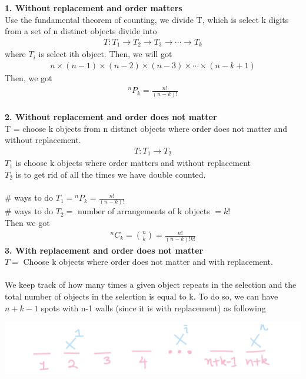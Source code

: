 \documentclass[11pt,oneside]{book}
\theoremstyle{break}
\theoremstyle{break}
\newcommand*{\Perm}[2]{{}^{#1}\!P_{#2}}
\newcommand*{\Comb}[2]{{}^{#1}C_{#2}}
\begin{document}
\hfill\\
\hfill\\
\textbf{1. Without replacement and order matters}\\
Use the fundamental theorem of counting, we divide T, which is select k digits from a set of n distinct objects divide into \begin{align*}
T:T_1\rightarrow T_2\rightarrow T_3 \rightarrow \cdots \rightarrow T_k
\end{align*}
where $T_i$ is select ith object. Then, we will got \begin{align*}
n\times (n-1)\times (n-2) \times (n-3) \times \cdots \times (n-k+1)
\end{align*}
Then, we got \begin{align*}
\Perm{n}{k}=\frac{n!}{(n-k)!}
\end{align*}
\hfill\\
\textbf{2. Without replacement and order does not matter}\\
T = choose k objects from n distinct objects where order does not matter and without replacement. \begin{align*}
T:T_1\rightarrow T_2
\end{align*}
$T_1$ is choose k objects where order matters and without replacement \\
$T_2$ is to get rid of all the times we have double counted.\\
\hfill\\
$\#$ ways to do $T_1=\Perm{n}{k}=\frac{n!}{(n-k)!}$\\
$\#$ ways to do $T_2=$ number of arrangements of k objects $=k!$\\
Then we got \begin{align*}
\Comb{n}{k}=\binom nk =\frac{n!}{(n-k)!k!}
\end{align*}
\textbf{3. With replacement and order does not matter}\\
$T=$ Choose k objects where order does not matter and with replacement. \\
\hfill\\
We keep track of how many times a given object repeats in the selection and the total number of objects in the selection is equal to k. To do so, we can have $n+k-1$ spots with n-1 walls (since it is with replacement) as following\begin{center}
\includegraphics[scale=0.3]{figures/withreplacement_doesnt_matter}
\end{center}
\end{document}
